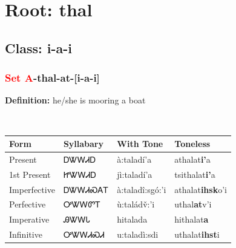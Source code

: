 \needspace{4in}
\section*{Root: thal}
\nopagebreak
{}
\needspace{3in}
\subsection*{Class: i-a-i}
\nopagebreak
\needspace{2in}
\subsubsection*{\textcolor{Red}{Set A}{-}\textbf{thal}{-}at{-}[i-a-i]}
\nopagebreak
\textbf{Definition: } he/she is mooring a boat
\\[0.5em]
\begin{tabularx}{\textwidth}{l X X X}%
\toprule%
\textbf{Form}&\textbf{Syllabary}&\textbf{With Tone}&\textbf{Toneless}\\%
\midrule%
Present&ᎠᏔᎳᏗᎠ&à:taladí’a&athalat\textbf{i'}a\\%
1st Present&ᏥᏔᎳᏗᎠ&jì:taladí’a&tsithalat\textbf{i'}a\\%
Imperfective&ᎠᏔᎳᏗᏍᎪᎢ&à:taladî:sgó:’i&athalat\textbf{ihsk}o'i\\%
Perfective&ᎤᏔᎳᏛᎢ&ù:taládv̌:’i&uthal\textbf{at}v'i\\%
Imperative&ᎯᏔᎳᏓ&hitalada&hithalat\textbf{a}\\%
Infinitive&ᎤᏔᎳᏗᏍᏗ&u:taladì:sdi&uthalat\textbf{ihst}i\\%
\bottomrule%
\end{tabularx}
\\[1em]